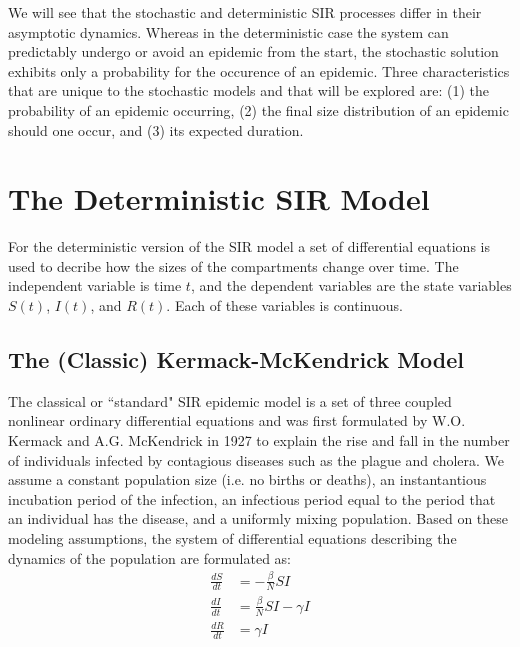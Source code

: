 \documentclass[reqno,11pt]{amsart}
\begin{document}
	We will see that the stochastic and deterministic SIR processes differ in their asymptotic dynamics. Whereas in the deterministic case the system can predictably undergo or avoid an epidemic from the start, the stochastic solution exhibits only a probability for the occurence of an epidemic. Three characteristics that are unique to the stochastic models and that will be explored are: (1) the probability of an epidemic occurring, (2) the final size distribution of an epidemic should one occur, and (3) its expected duration.
%
%
%
%
\section{The Deterministic SIR Model}

	For the deterministic version of the SIR model a set of differential equations is used to decribe how the sizes of the compartments change over time. The independent variable is
time $t$, and the dependent variables are the state variables $S(t)$, $I(t)$, and $R(t)$. Each of these variables is continuous.
%
%
%
%
\subsection{The (Classic) Kermack-McKendrick Model}
	The classical or ``standard" SIR epidemic model is a set of three coupled nonlinear ordinary differential equations and was first formulated by W.O. Kermack and A.G. McKendrick in 1927 to explain the rise and fall in the number of individuals infected by contagious diseases such as the plague and cholera. We assume a constant population size (i.e. no births or deaths), an instantantious incubation period of the infection, an infectious period equal to the period that an individual has the disease, and a uniformly mixing population. Based on these modeling assumptions, the system of differential equations describing the dynamics of the population are formulated as:
\begin{subequations}\label{SIR_ODEs}
\begin{align}
\frac{dS}{dt} &= -\frac{\beta}{N} S I \label{SIR_dSdt} \\
\frac{dI}{dt} &= \frac{\beta}{N} SI - \gamma I \label{SIR_dIdt} \\
\frac{dR}{dt} &= \gamma I \label{SIR_dRdt}
\end{align}
\end{subequations}
\end{document}
